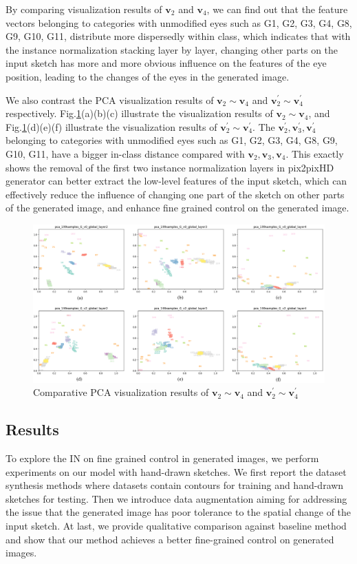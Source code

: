 \documentclass[10pt,twocolumn,letterpaper]{article}
\begin{document}
By comparing visualization results of $\boldsymbol{v}_2$ and $\boldsymbol{v}_4$, we can find out that the feature vectors belonging to categories with unmodified eyes such as G1, G2, G3, G4, G8, G9, G10, G11, distribute more dispersedly within class, which indicates that with the instance normalization  stacking layer by layer, changing other parts on the input sketch has more and more obvious influence on the features of the eye position, leading to the changes of the eyes in the generated image.

We also contrast the PCA visualization results of $\boldsymbol{v}_2 \sim \boldsymbol{v}_4$ and $\boldsymbol{v}_2^{'} \sim \boldsymbol{v}_4^{'}$ respectively. Fig.\ref{fig:pca_4}(a)(b)(c) illustrate the visualization results of $\boldsymbol{v}_2 \sim \boldsymbol{v}_4$, and Fig.\ref{fig:pca_4}(d)(e)(f) illustrate the visualization results of $\boldsymbol{v}_2^{'} \sim \boldsymbol{v}_4^{'}$. The $\boldsymbol{v}_2^{'}, \boldsymbol{v}_3^{'}, \boldsymbol{v}_4^{'}$ belonging to categories with unmodified eyes such as G1, G2, G3, G4, G8, G9, G10, G11, have a bigger in-class distance compared with $\boldsymbol{v}_2, \boldsymbol{v}_3, \boldsymbol{v}_4$. 
This exactly shows the removal of the first two instance normalization layers in pix2pixHD generator can better extract the low-level features of the input sketch, which can effectively reduce the influence of changing one part of the sketch on other parts of the generated image, and enhance fine grained control on the generated image.
\begin{figure}[htb]
	\centering
	\includegraphics[width=0.8 \textwidth]{pca_4.png}
	\caption{Comparative PCA visualization results of $\boldsymbol{v}_2 \sim \boldsymbol{v}_4$ and $\boldsymbol{v}_2^{'} \sim \boldsymbol{v}_4^{'}$}
	\label{fig:pca_4}
\end{figure}


\subsection{Results}\label{sec:results}
To explore the IN on fine grained control in generated images, we perform experiments on our model with hand-drawn sketches. We first report the dataset synthesis methods where datasets contain contours for training and hand-drawn sketches for testing. 
Then we introduce data augmentation aiming for addressing the issue that the generated image has poor tolerance to the spatial change of the input sketch. 
At last, we provide qualitative comparison against baseline method and show that our method achieves a better fine-grained control on generated images. 
\end{document}
